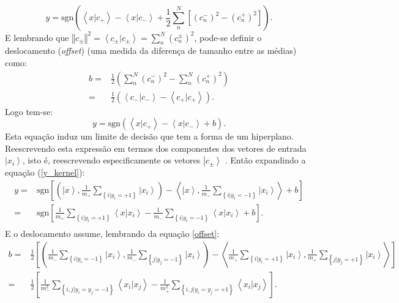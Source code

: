 \begin{equation}
y=\text{sgn}\left(\left\langle x|c_{+}\right\rangle -\left\langle x|c_{-}\right\rangle +\frac{1}{2}\sum_{n}^{N}\left[\left(c_{n}^{-}\right)^{2}-\left(c_{n}^{+}\right)^{2}\right]\right) .
\end{equation}
E lembrando que $\left\Vert c_{\pm}\right\Vert ^{2}=\left\langle c_{\pm}|c_{\pm}\right\rangle =\sum_{n}^{N}\left(c_{n}^{\pm}\right)^{2}$, pode-se definir o deslocamento (\textit{offset}) (uma medida da diferença de tamanho entre as médias) como:
\begin{equation}
\begin{split}
b=&\frac{1}{2}\left(\sum_{n}^{N}\left(c_{n}^{-}\right)^{2}-\sum_{n}^{N}\left(c_{n}^{+}\right)^{2}\right)\\
=&\frac{1}{2}\left(\left\langle c_{-}|c_{-}\right\rangle -\left\langle c_{+}|c_{+}\right\rangle \right).
\end{split}
\label{offset} 
\end{equation}
Logo tem-se:
\begin{equation}
y=\text{sgn}\left(\left\langle x|c_{+}\right\rangle -\left\langle x|c_{-}\right\rangle +b\right)
\label{y_kernel} .
\end{equation}
Esta equação induz um limite de decisão que tem a forma de um hiperplano. Reescrevendo esta expressão em termos dos componentes dos vetores de entrada $\left|x_i\right\rangle $, isto é, reescrevendo especificamente  os vetores $\left|c_{\pm}\right\rangle $  .  Então expandindo a equação (\ref{y_kernel}):
\begin{equation}
\begin{split}
y= & \text{sgn}\left[\left(\left|x\right\rangle ,\frac{1}{m_{+}}\sum_{\left\{ i|y_{i}=+1\right\} }\left|x_{i}\right\rangle \right)-\left\langle \left|x\right\rangle ,\frac{1}{m_{-}}\sum_{\left\{ i|y_{i}=-1\right\} }\left|x_{i}\right\rangle \right\rangle +b\right] \\
=&\text{sgn}\left[\frac{1}{m_{+}}\sum_{\left\{ i|y_{i}=+1\right\} }\left\langle x|x_{i}\right\rangle -\frac{1}{m_{-}}\sum_{\left\{ i|y_{i}=-1\right\} }\left\langle x|x_{i}\right\rangle +b\right]. \\
\end{split} 
\end{equation}
E o deslocamento assume, lembrando da equação \ref{offset}:
\begin{equation}
\begin{split}
b= & \frac{1}{2}\left[\left(\frac{1}{m_{-}}\sum_{\left\{ i|y_{i}=-1\right\} }\left|x_{i}\right\rangle ,\frac{1}{m_{-}}\sum_{\left\{ j|y_{j}=-1\right\} }\left|x_{i}\right\rangle \right)-\left\langle \frac{1}{m_{+}}\sum_{\left\{ i|y_{i}=+1\right\} }\left|x_{i}\right\rangle ,\frac{1}{m_{+}}\sum_{\left\{ j|y_{j}=+1\right\} }\left|x_{i}\right\rangle \right\rangle \right] \\
=& \frac{1}{2}\left[\frac{1}{m_{-}^{2}}\sum_{\left\{ i,j|y_{i}=y_{j}=-1\right\} }\left\langle x_{i}|x_{j}\right\rangle -\frac{1}{m_{+}^{2}}\sum_{\left\{ i,j|y_{i}=y_{j}=+1\right\} }\left\langle x_{i}|x_{j}\right\rangle \right].
\end{split} 
\end{equation}

